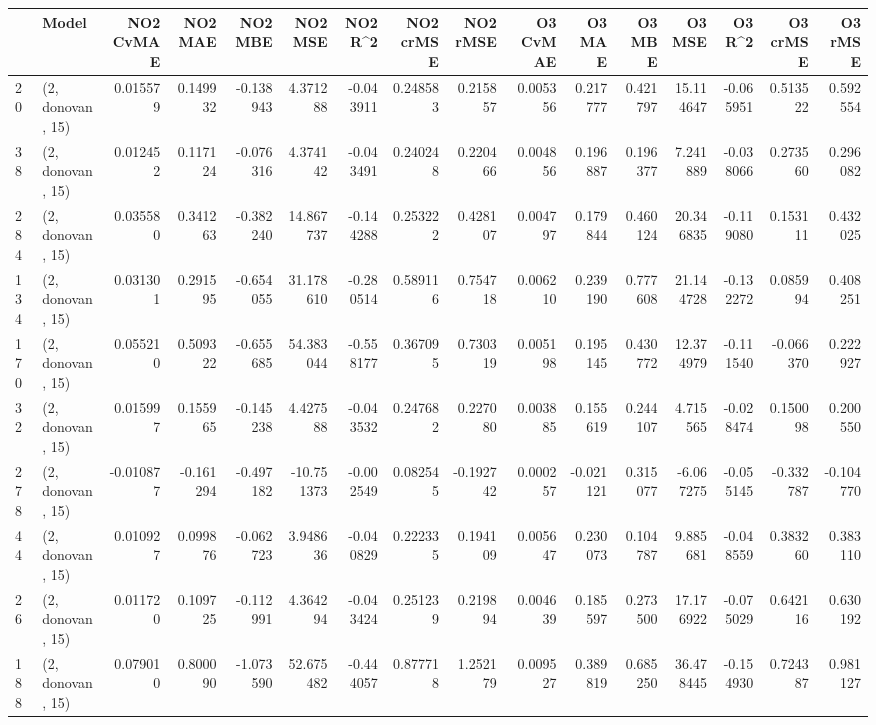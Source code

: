 \begin{tabular}{llrrrrrrrrrrrrrr}
\toprule
{} &             Model &  NO2 CvMAE &   NO2 MAE &   NO2 MBE &      NO2 MSE &    NO2 R\textasciicircum2 &  NO2 crMSE &   NO2 rMSE &  O3 CvMAE &    O3 MAE &    O3 MBE &      O3 MSE &    O3 R\textasciicircum2 &  O3 crMSE &   O3 rMSE \\
\midrule
20  &  (2, donovan, 15) &   0.015579 &  0.149932 & -0.138943 &     4.371288 &  -0.043911 &   0.248583 &   0.215857 &  0.005356 &  0.217777 &  0.421797 &   15.114647 & -0.065951 &  0.513522 &  0.592554 \\
38  &  (2, donovan, 15) &   0.012452 &  0.117124 & -0.076316 &     4.374142 &  -0.043491 &   0.240248 &   0.220466 &  0.004856 &  0.196887 &  0.196377 &    7.241889 & -0.038066 &  0.273560 &  0.296082 \\
284 &  (2, donovan, 15) &   0.035580 &  0.341263 & -0.382240 &    14.867737 &  -0.144288 &   0.253222 &   0.428107 &  0.004797 &  0.179844 &  0.460124 &   20.346835 & -0.119080 &  0.153111 &  0.432025 \\
134 &  (2, donovan, 15) &   0.031301 &  0.291595 & -0.654055 &    31.178610 &  -0.280514 &   0.589116 &   0.754718 &  0.006210 &  0.239190 &  0.777608 &   21.144728 & -0.132272 &  0.085994 &  0.408251 \\
170 &  (2, donovan, 15) &   0.055210 &  0.509322 & -0.655685 &    54.383044 &  -0.558177 &   0.367095 &   0.730319 &  0.005198 &  0.195145 &  0.430772 &   12.374979 & -0.111540 & -0.066370 &  0.222927 \\
32  &  (2, donovan, 15) &   0.015997 &  0.155965 & -0.145238 &     4.427588 &  -0.043532 &   0.247682 &   0.227080 &  0.003885 &  0.155619 &  0.244107 &    4.715565 & -0.028474 &  0.150098 &  0.200550 \\
278 &  (2, donovan, 15) &  -0.010877 & -0.161294 & -0.497182 &   -10.751373 &  -0.002549 &   0.082545 &  -0.192742 &  0.000257 & -0.021121 &  0.315077 &   -6.067275 & -0.055145 & -0.332787 & -0.104770 \\
44  &  (2, donovan, 15) &   0.010927 &  0.099876 & -0.062723 &     3.948636 &  -0.040829 &   0.222335 &   0.194109 &  0.005647 &  0.230073 &  0.104787 &    9.885681 & -0.048559 &  0.383260 &  0.383110 \\
26  &  (2, donovan, 15) &   0.011720 &  0.109725 & -0.112991 &     4.364294 &  -0.043424 &   0.251239 &   0.219894 &  0.004639 &  0.185597 &  0.273500 &   17.176922 & -0.075029 &  0.642116 &  0.630192 \\
188 &  (2, donovan, 15) &   0.079010 &  0.800090 & -1.073590 &    52.675482 &  -0.444057 &   0.877718 &   1.252179 &  0.009527 &  0.389819 &  0.685250 &   36.478445 & -0.154930 &  0.724387 &  0.981127 \\

\end{tabular}

